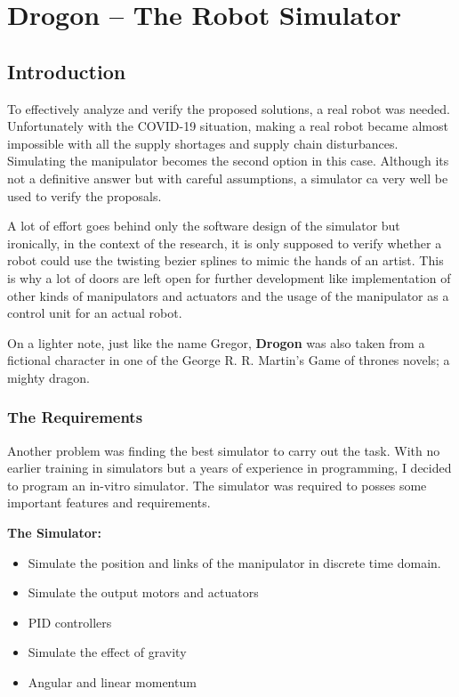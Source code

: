 \section{Drogon -- The Robot Simulator}\label{Chapter:Drogon}
{
    \subsection{Introduction}

    To effectively analyze and verify the proposed solutions, a real robot was needed. Unfortunately with the COVID-19 situation, making a real robot became almost impossible with all the supply shortages and supply chain disturbances. Simulating the manipulator becomes the second option in this case. Although its not a definitive answer but with careful assumptions, a simulator ca very well be used to verify the proposals.

    A lot of effort goes behind only the software design of the simulator but ironically, in the context of the research, it is only supposed to verify whether a robot could use the twisting bezier splines to mimic the hands of an artist. This is why a lot of doors are left open for further development like implementation of other kinds of manipulators and actuators and the usage of the manipulator as a control unit for an actual robot.

    On a lighter note, just like the name Gregor, \textbf{Drogon} was also taken from a fictional character in one of the George R. R. Martin's Game of thrones novels; a mighty dragon.

    \subsubsection{The Requirements}
    Another problem was finding the best simulator to carry out the task. With no earlier training in simulators but a years of experience in programming, I decided to program an in-vitro simulator. The simulator was required to posses some important features and requirements.

    \textbf{The Simulator:}
    \begin{itemize}
      \item Simulate the position and links of the manipulator in discrete time domain.
      \item Simulate the output motors and actuators
      \item PID controllers
      \item Simulate the effect of gravity
      \item Angular and linear momentum
    \end{itemize}

}

